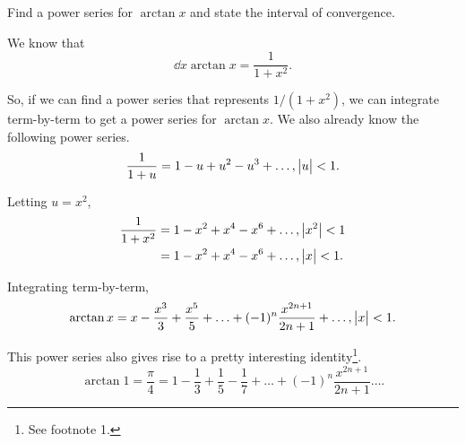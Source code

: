 \begin{example}
	Find a power series for $\arctan{x}$ and state the interval of convergence.
\end{example}
\begin{answer}
	We know that
	\begin{equation*}
		\dd{}{x}\arctan{x} = \frac{1}{1+x^2}.
	\end{equation*}
	
	So, if we can find a power series that represents $1/(1+x^2)$, we can integrate term-by-term to get a power series for $\arctan{x}$.
	We also already know the following power series.
	\begin{equation*}
		\frac{1}{1+u} = 1 - u + u^2 - u^3 + \ldots, \big\lvert u \big\rvert < 1.
	\end{equation*}
	
	Letting $u=x^2$,
	\begin{align*}
		\frac{1}{1+x^2} &= 1 - x^2 + x^4 - x^6 + \ldots, \big\lvert x^2 \big\rvert < 1 \\
		&= 1 - x^2 + x^4 - x^6 + \ldots, \big\lvert x \big\rvert < 1.
	\end{align*}
	
	Integrating term-by-term,
	\begin{align*}
		\arctan{x} = x - \frac{x^3}{3} + \frac{x^5}{5} + \ldots + (-1)^n\frac{x^{2n+1}}{2n+1} + \ldots, \big\lvert x \big\rvert < 1.
	\end{align*}
	
	This power series also gives rise to a pretty interesting identity\footnote{See footnote 1.}.
	\begin{equation*}
		\arctan{1} = \frac{\pi}{4} = 1 - \frac{1}{3} + \frac{1}{5} - \frac{1}{7} + \ldots + (-1)^n\frac{x^{2n+1}}{2n+1} \ldots.
	\end{equation*}
\end{answer}